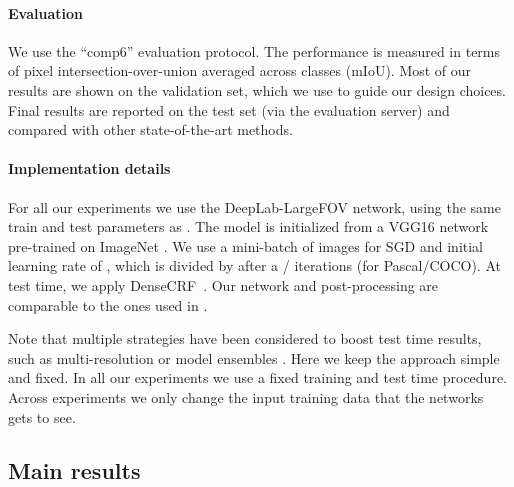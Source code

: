 \documentclass[10pt,english,british,twocolumn]{article}
\begin{document}
\paragraph{Evaluation}

We use the ``comp6'' evaluation protocol. The performance is measured
in terms of pixel intersection-over-union averaged across  classes
(mIoU). Most of our results are shown on the validation set, which
we use to guide our design choices.\textcolor{brown}{{} }Final results
are reported on the test set (via the evaluation server) and compared
with other state-of-the-art methods.

\paragraph{Implementation details}

For all our experiments we use the Deep\-Lab\--Large\-FOV network,
using the same train and test parameters as \cite{Chen2015Iclr}.
The model is initialized from a VGG16 network pre-trained on ImageNet
\cite{Simonyan2015Iclr}. We use a mini-batch of  images for
SGD and initial learning rate of , which is divided by 
after a / iterations (for Pascal/COCO). At
test time, we apply DenseCRF~\cite{Kraehenbuehl2011Nips}. Our network
and post-processing are comparable to the ones used in \cite{Dai2015Iccv,Papandreou2015Iccv}.

Note that multiple strategies have been considered to boost test time
results, such as multi-resolution or model ensembles \cite{Chen2015Iclr,Kokkinos2016Iclr}.
Here we keep the approach simple and fixed. In all our experiments
we use a fixed training and test time procedure. Across experiments
we only change the input training data that the networks gets to see.

\subsection{\label{subsec:Main-results}Main results}
\end{document}
